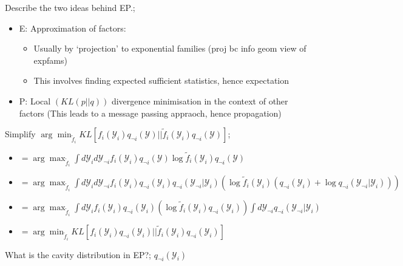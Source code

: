 \documentclass{article}
\begin{document}
Describe the two ideas behind EP.; \begin{itemize} \item E: Approximation of factors: \begin{itemize} \item Usually by `projection' to exponential families (proj bc info geom view of expfams) \item This involves finding expected sufficient statistics, hence expectation \end{itemize} \item P: Local $(KL(p||q))$ divergence minimisation in the context of other factors (This leads to a message passing appraoch, hence propagation) \end{itemize}

Simplify $\arg\min_{\tilde{f}_i}KL[f_i(\mathcal{Y}_i)q_{\neg i}(\mathcal{Y})||\tilde{f}_i(\mathcal{Y}_i)q_{\neg i}(\mathcal{Y})]$; \begin{itemize} \item $=\arg\max_{\tilde{f}_i} \int d\mathcal{Y}_i d\mathcal{Y}_{\neg i} f_i(\mathcal{Y}_i)q_{\neg i}(\mathcal{Y})\log \tilde{f}_i(\mathcal{Y}_i) q_{\neg i}(\mathcal{Y})$ \item $=\arg\max_{\tilde{f}_i} \int d\mathcal{Y}_i d\mathcal{Y}_{\neg i} f_i(\mathcal{Y}_i)q_{\neg i}(\mathcal{Y}_i)q_{\neg i}(\mathcal{Y}_{\neg i}|\mathcal{Y}_i)(\log \tilde{f}_i(\mathcal{Y}_i)(q_{\neg i}(\mathcal{Y}_i)+\log q_{\neg i}(\mathcal{Y}_{\neg i}|\mathcal{Y}_i)))$ \item $=\arg\max_{\tilde{f}_i} \int d\mathcal{Y}_i f_i(\mathcal{Y}_i)q_{\neg i}(\mathcal{Y}_i)(\log \tilde{f}_i(\mathcal{Y}_i)q_{\neg i}(\mathcal{Y}_i)) \int d\mathcal{Y}_{\neg i} q_{\neg i}(\mathcal{Y}_{\neg i}|\mathcal{Y}_i)$ \item $=\arg\min_{\tilde{f}_i}KL[f_i(\mathcal{Y}_i)q_{\neg i}(\mathcal{Y}_i)||\tilde{f}_i(\mathcal{Y}_i)q_{\neg i}(\mathcal{Y}_i)]$ \end{itemize}

What is the cavity distribution in EP?; $q_{\neg i}(\mathcal{Y}_i)$
\end{document}
